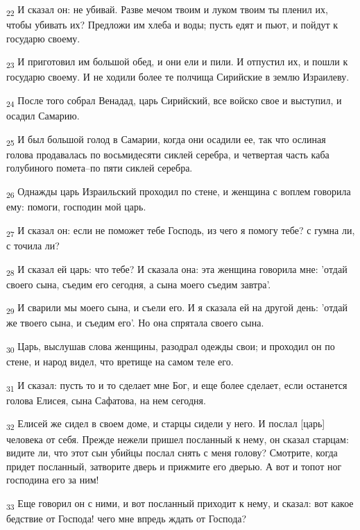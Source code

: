 \begin{tcolorbox}
\textsubscript{22} И сказал он: не убивай. Разве мечом твоим и луком твоим ты пленил их, чтобы убивать их? Предложи им хлеба и воды; пусть едят и пьют, и пойдут к государю своему.
\end{tcolorbox}
\begin{tcolorbox}
\textsubscript{23} И приготовил им большой обед, и они ели и пили. И отпустил их, и пошли к государю своему. И не ходили более те полчища Сирийские в землю Израилеву.
\end{tcolorbox}
\begin{tcolorbox}
\textsubscript{24} После того собрал Венадад, царь Сирийский, все войско свое и выступил, и осадил Самарию.
\end{tcolorbox}
\begin{tcolorbox}
\textsubscript{25} И был большой голод в Самарии, когда они осадили ее, так что ослиная голова продавалась по восьмидесяти сиклей серебра, и четвертая часть каба голубиного помета--по пяти сиклей серебра.
\end{tcolorbox}
\begin{tcolorbox}
\textsubscript{26} Однажды царь Израильский проходил по стене, и женщина с воплем говорила ему: помоги, господин мой царь.
\end{tcolorbox}
\begin{tcolorbox}
\textsubscript{27} И сказал он: если не поможет тебе Господь, из чего я помогу тебе? с гумна ли, с точила ли?
\end{tcolorbox}
\begin{tcolorbox}
\textsubscript{28} И сказал ей царь: что тебе? И сказала она: эта женщина говорила мне: 'отдай своего сына, съедим его сегодня, а сына моего съедим завтра'.
\end{tcolorbox}
\begin{tcolorbox}
\textsubscript{29} И сварили мы моего сына, и съели его. И я сказала ей на другой день: 'отдай же твоего сына, и съедим его'. Но она спрятала своего сына.
\end{tcolorbox}
\begin{tcolorbox}
\textsubscript{30} Царь, выслушав слова женщины, разодрал одежды свои; и проходил он по стене, и народ видел, что вретище на самом теле его.
\end{tcolorbox}
\begin{tcolorbox}
\textsubscript{31} И сказал: пусть то и то сделает мне Бог, и еще более сделает, если останется голова Елисея, сына Сафатова, на нем сегодня.
\end{tcolorbox}
\begin{tcolorbox}
\textsubscript{32} Елисей же сидел в своем доме, и старцы сидели у него. И послал [царь] человека от себя. Прежде нежели пришел посланный к нему, он сказал старцам: видите ли, что этот сын убийцы послал снять с меня голову? Смотрите, когда придет посланный, затворите дверь и прижмите его дверью. А вот и топот ног господина его за ним!
\end{tcolorbox}
\begin{tcolorbox}
\textsubscript{33} Еще говорил он с ними, и вот посланный приходит к нему, и сказал: вот какое бедствие от Господа! чего мне впредь ждать от Господа?
\end{tcolorbox}
